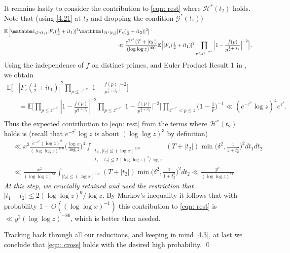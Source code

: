 \documentclass[12pt, notitlepage]{amsart}
\numberwithin{equation}{section}
\def\E{\mathbb E}
\theoremstyle{remark}
\theoremstyle{definition}
\theoremstyle{remark}
\numberwithin{equation}{section}
\begin{document}
It remains lastly to consider the contribution to \eqref{eqn: rest} where $\mathcal{H}^{*}(t_2)$ holds. Note that (using \eqref{4.21} at $t_2$ and dropping the condition ${\mathcal G}^*(t_1)$) 
\begin{align*}
\E\Big[ {\mathbbm 1}_{{\mathcal G}^*(t_1)} |F_z(\tfrac 12+it_1)|^2 {\mathbbm 1}_{{\mathcal H}^*(t_2)}& |F_z(\tfrac 12+it_2)|^2] 
\\
&\ll \frac{e^{2\tau^*}(T+|t_2|)}{(\log \log z)^{100}} \E\Big[ |F_z(\tfrac 12+it_1)|^2 \prod_{p\le z^{e^{-\tau^*}}} \Big| 1- \frac{f(p)}{p^{\frac 12+it_2}}\Big|^{-2}\Big].
\end{align*} 
Using the independence of $f$ on distinct primes, and Euler Product Result 1 in  \cite{Harperlargevalue}, we obtain 
\begin{align*}
 \E\Big[ &|F_z(\tfrac 12+it_1)|^2 \prod_{p\le z^{e^{-\tau^*}}} \Big| 1- \frac{f(p)}{p^{\frac 12+it_2}}\Big|^{-2}\Big] \\
 &=\E\Big[ \prod_{p\le z^{e^{-\tau^{*}}}} |1- \frac{f(p)}{p^{\frac{1}{2}+it_1}}|^{-2} \prod_{p\le z^{e^{-\tau^{*}}}} \Big|1- \frac{f(p)}{p^{\frac{1}{2}+it_2}}\Big|^{-2} \Big] \prod_{z^{e^{-\tau^*}} < p\le z}\Big(1-\frac 1p\Big)^{-1} \ll (e^{-\tau^*} \log z)^4 e^{\tau^*}.\\ 
 \end{align*}
Thus the expected contribution to \eqref{eqn: rest} from the terms where $\mathcal{H}^{*}(t_2)$ holds is (recall that $e^{-\tau^*} \log z$ is about $(\log \log z)^{3}$ by definition)
\begin{align*}
&\ll x^2 \frac{e^{-\tau^*} (\log z)^2}{(\log \log z)^{100}} \Big(\frac{\log x}{\log z}\Big)^4 \int_{\substack{ |t_1|, |t_2| \le (\log x)^{100} \\ |t_1-t_2| \le 2 (\log \log z)^9/\log z}} 
(T+|t_2|) \min\Big(\delta^2,\frac{1}{1+t_2^2}\Big)^2 dt_1 dt_2 
\\
&\ll \frac{x^2}{(\log \log z)^{87}} \int_{|t_2|\le (\log x)^{100}} (T+|t_2|)  \min\Big(\delta^2,\frac{1}{1+t_2^2}\Big)^2 dt_2 \ll \frac{y^2}{(\log \log z)^{87}}. 
\end{align*} 
{\em At this step, we crucially retained and used the restriction that $|t_1-t_2| \le 2 (\log \log z)^9/\log z$.} By Markov's inequality it follows that with probability $1-O((\log \log x)^{-1})$ this contribution to \eqref{eqn: rest} is $\ll y^2 (\log \log z)^{-86}$, which is better than needed.  

Tracking back through all our reductions, and keeping in mind \eqref{4.3}, at last we conclude that \eqref{eqn: cross} holds with the desired high probability.
\qed
\end{document}
